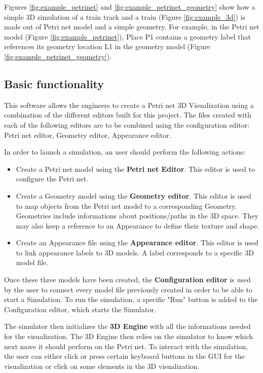 Figures \ref{fig:example_petrinet} and \ref{fig:example_petrinet_geometry} show how a simple 3D simulation of a train track and a train (Figure \ref{fig:example_3d}) is made out of Petri net model and a simple geometry. For example, in the Petri net model (Figure \ref{fig:example_petrinet}), Place P1 contains a geometry label that references its geometry location L1 in the geometry model (Figure \ref{fig:example_petrinet_geometry}).

\newpage

\subsection{Basic functionality}
This software allows the engineers to create a Petri net 3D Visualization using a combination of the different editors built for this project.
The files created with each of the following editors are to be combined using the configuration editor: \newline
Petri net editor, Geometry editor, Appearance editor. 

In order to launch a simulation, an user should perform the following actions:

\begin{itemize}
  \item Create a Petri net model using the \textbf{Petri net Editor}. This editor is used to configure the Petri net.
  \item Create a Geometry model using the \textbf{Geometry editor}. This editor is used to map objects from the Petri net model to a corresponding Geometry. Geometries include informations about positions/paths in the 3D space. They may also keep a reference to an Appearance to define their texture and shape.
  \item Create an Appearance file using the \textbf{Appearance editor}. This editor is used to link appearance labels to 3D models. A label corresponds to a specific 3D model file. 
\end{itemize}

Once these three models have been created, the \textbf{Configuration editor} is used by the user to connect every model file previously created in order to be able to start a Simulation. 
To run the simulation, a specific "Run" button is added to the Configuration editor, which starts the Simulator.
\newline

The simulator then initializes the \textbf{3D Engine} with all the informations needed for the visualization. The 3D Engine then relies on the simulator to know which next move it should perform on the Petri net. \newline
To interact with the simulation, the user can either click or press certain keyboard buttons in the GUI for the visualization or click on some elements in the 3D visualization.

